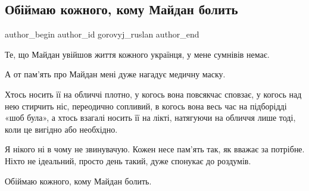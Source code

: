  
 
 
 
 
 
\subsection{Обіймаю кожного, кому Майдан болить}
\label{sec:21_11_2021.fb.gorovyj_ruslan.1.obijmaju_kozhnogo_maidan}
 
\ifcmt
 author_begin
   author_id gorovyj_ruslan
 author_end
\fi

Те, що Майдан увійшов життя кожного українця, у мене сумнівів немає. 

А от пам’ять про Майдан мені дуже нагадує медичну маску. 

Хтось носить її на обличчі плотно, у когось вона повсякчас сповзає, у когось
над нею стирчить ніс, переодично сопливий, в когось вона весь час на підборідді
«шоб була», а хтось взагалі носить її на лікті, натягуючи на обличчя лише тоді,
коли це вигідно або необхідно. 

Я нікого ні в чому не звинувачую. Кожен несе пам’ять так, як вважає за
потрібне. Ніхто не ідеальний, просто день такий, дуже спонукає до роздумів.

Обіймаю кожного, кому Майдан болить.

